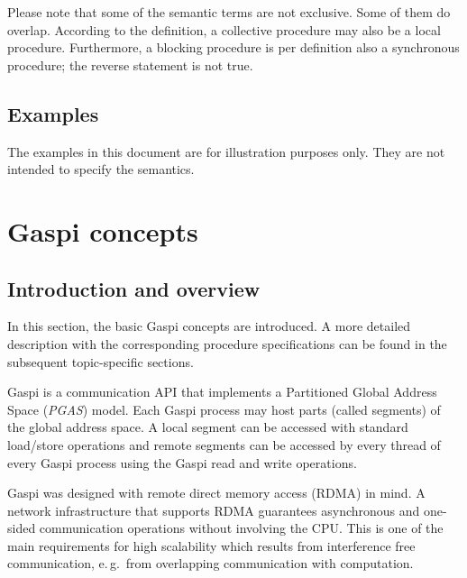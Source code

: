 \documentclass[a4paper]{article}
\newlength{\st}\setlength{\st}{0pt}
\newcommand{\GASPI}{{\sc Gaspi}}
\begin{document}
Please note that some of the semantic terms are not exclusive. Some of
them do overlap. According to the definition, a collective procedure
may also be a local procedure. Furthermore, a blocking procedure is
per definition also a synchronous procedure; the reverse statement is
not true.



\subsection{Examples}

The examples in this document are for illustration purposes only. They
are not intended to specify the semantics.


\section{\GASPI{} concepts}

\subsection{Introduction and overview}

In this section, the basic \GASPI{} concepts are introduced. A more detailed
description with the corresponding procedure specifications can be found
in the subsequent topic-specific sections.

\GASPI{} is a communication API that implements a Partitioned Global
Address Space (\emph{PGAS}) model. Each \GASPI{} process may host 
parts (called segments) of the global address space. A local segment 
can be accessed with standard load/store operations and remote segments
can be accessed by every thread of every \GASPI{} process using the
\GASPI{} read and write operations.

\GASPI{} was designed with remote direct memory access (RDMA) in mind.
A network infrastructure that supports RDMA guarantees asynchronous and
one-sided communication operations without involving the CPU. This is
one of the main requirements for high scalability which results from
interference free communication, e.\,g.\ from overlapping communication
with computation.
\end{document}
